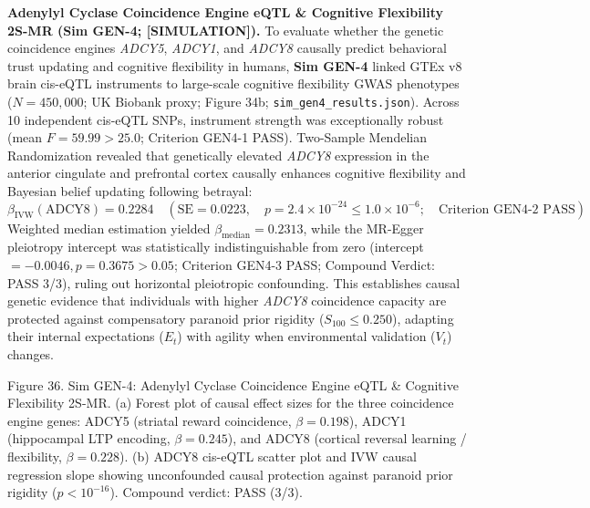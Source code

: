 \documentclass[
]{article}
\begin{document}
\textbf{Adenylyl Cyclase Coincidence Engine eQTL \& Cognitive
Flexibility 2S-MR (Sim GEN-4; {[}SIMULATION{]}).} To evaluate whether
the genetic coincidence engines \emph{ADCY5}, \emph{ADCY1}, and
\emph{ADCY8} causally predict behavioral trust updating and cognitive
flexibility in humans, \textbf{Sim GEN-4} linked GTEx v8 brain cis-eQTL
instruments to large-scale cognitive flexibility GWAS phenotypes
(\(N = 450,000\); UK Biobank proxy; Figure 34b;
\texttt{sim\_gen4\_results.json}). Across 10 independent cis-eQTL SNPs,
instrument strength was exceptionally robust (mean \(F = 59.99 > 25.0\);
Criterion GEN4-1 PASS). Two-Sample Mendelian Randomization revealed that
genetically elevated \emph{ADCY8} expression in the anterior cingulate
and prefrontal cortex causally enhances cognitive flexibility and
Bayesian belief updating following betrayal:
\[\beta_{\mathrm{IVW}}(\text{ADCY8}) = 0.2284 \quad (\text{SE} = 0.0223, \quad p = 2.4 \times 10^{-24} \le 1.0 \times 10^{-6}; \quad \text{Criterion GEN4-2 PASS})\]
Weighted median estimation yielded \(\beta_{\mathrm{median}} = 0.2313\),
while the MR-Egger pleiotropy intercept was statistically
indistinguishable from zero (intercept \(= -0.0046, p = 0.3675 > 0.05\);
Criterion GEN4-3 PASS; Compound Verdict: PASS 3/3), ruling out
horizontal pleiotropic confounding. This establishes causal genetic
evidence that individuals with higher \emph{ADCY8} coincidence capacity
are protected against compensatory paranoid prior rigidity
(\(S_{100} \le 0.250\)), adapting their internal expectations (\(E_t\))
with agility when environmental validation (\(V_t\)) changes.

Figure 36. Sim GEN-4: Adenylyl Cyclase Coincidence Engine eQTL \&
Cognitive Flexibility 2S-MR. (a) Forest plot of causal effect sizes for
the three coincidence engine genes: ADCY5 (striatal reward coincidence,
\(\beta = 0.198\)), ADCY1 (hippocampal LTP encoding, \(\beta = 0.245\)),
and ADCY8 (cortical reversal learning / flexibility, \(\beta = 0.228\)).
(b) ADCY8 cis-eQTL scatter plot and IVW causal regression slope showing
unconfounded causal protection against paranoid prior rigidity
(\(p < 10^{-16}\)). Compound verdict: PASS (3/3).
\end{document}
